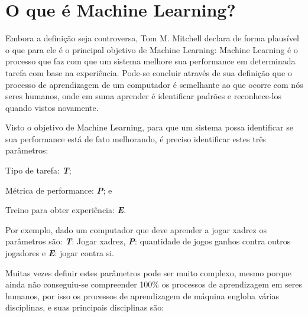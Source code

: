\section{O que é Machine Learning?}
\label{sec:oqueemachinelearning}

Embora a definição seja controversa, Tom M. Mitchell declara de forma plausível o que para ele é o principal objetivo de Machine Learning: Machine Learning é o processo que faz com que um sistema melhore
sua performance em determinada tarefa com base na experiência\cite{Tom}. Pode-se concluir através de sua definição que o processo de aprendizagem de um 
computador é semelhante ao que ocorre com nós seres humanos, onde em suma aprender é identificar padrões e reconhece-los quando vistos novamente.

Visto o objetivo de Machine Learning, para que um sistema possa identificar se sua performance está de fato melhorando, é preciso identificar estes três parâmetros:
 \begin{alineascomponto}
	\item Tipo de tarefa: \textbf{\textit{T}};
	\item Métrica de performance: \textbf{\textit{P}}; e
	\item Treino para obter experiência: \textbf{\textit{E}}.			
\end{alineascomponto}
Por exemplo, dado um computador que deve aprender a jogar xadrez os parâmetros são: \textbf{\textit{T}}: Jogar xadrez, \textbf{\textit{P}}: quantidade de jogos ganhos contra outros jogadores e
\textbf{\textit{E}}: jogar contra si.

Muitas vezes definir estes parâmetros pode ser muito complexo, mesmo porque ainda não conseguiu-se compreender 100\% os processos
de aprendizagem em seres humanos, por isso os processos de aprendizagem de máquina engloba várias disciplinas, e suas principais disciplinas são: 
 
